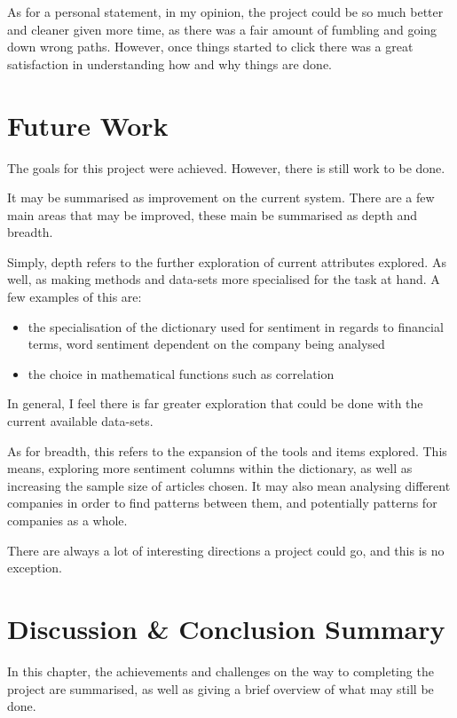 As for a personal statement, in my opinion, the project could be so much better and cleaner given more time, as there was a fair amount of fumbling and going down wrong paths. However, once things started to click there was a great satisfaction in understanding how and why things are done.

\section{Future Work}

The goals for this project were achieved. However, there is still work to be done.

It may be summarised as improvement on the current system. There are a few main areas that may be improved, these main be summarised as depth and breadth.

Simply, depth refers to the further exploration of current attributes explored. As well, as making methods and data-sets more specialised for the task at hand. A few examples of this are:
\begin{itemize}
    \item the specialisation of the dictionary used for sentiment in regards to financial terms, word sentiment dependent on the company being analysed
    \item the choice in mathematical functions such as correlation
\end{itemize}
In general, I feel there is far greater exploration that could be done with the current available data-sets.

As for breadth, this refers to the expansion of the tools and items explored. This means, exploring more sentiment columns within the dictionary, as well as increasing the sample size of articles chosen. It may also mean analysing different companies in order to find patterns between them, and potentially patterns for companies as a whole.

There are always a lot of interesting directions a project could go, and this is no exception.

\section{Discussion \& Conclusion Summary}

In this chapter, the achievements and challenges on the way to completing the project are summarised, as well as giving a brief overview of what may still be done.